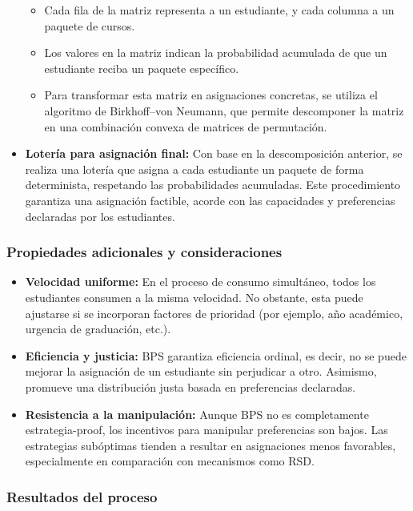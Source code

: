 \documentclass{article}
\begin{document}
\begin{itemize}
    \begin{itemize}
        \item Cada fila de la matriz representa a un estudiante, y cada columna a un paquete de cursos.
        \item Los valores en la matriz indican la probabilidad acumulada de que un estudiante reciba un paquete específico.
        \item Para transformar esta matriz en asignaciones concretas, se utiliza el algoritmo de Birkhoff–von Neumann, que permite descomponer la matriz en una combinación convexa de matrices de permutación.
    \end{itemize}

    \item \textbf{Lotería para asignación final:} Con base en la descomposición anterior, se realiza una lotería que asigna a cada estudiante un paquete de forma determinista, respetando las probabilidades acumuladas. Este procedimiento garantiza una asignación factible, acorde con las capacidades y preferencias declaradas por los estudiantes.
\end{itemize}

\subsubsection{Propiedades adicionales y consideraciones}

\begin{itemize}
    \item \textbf{Velocidad uniforme:} En el proceso de consumo simultáneo, todos los estudiantes consumen a la misma velocidad. No obstante, esta puede ajustarse si se incorporan factores de prioridad (por ejemplo, año académico, urgencia de graduación, etc.).

    \item \textbf{Eficiencia y justicia:} BPS garantiza eficiencia ordinal, es decir, no se puede mejorar la asignación de un estudiante sin perjudicar a otro. Asimismo, promueve una distribución justa basada en preferencias declaradas.

    \item \textbf{Resistencia a la manipulación:} Aunque BPS no es completamente estrategia-proof, los incentivos para manipular preferencias son bajos. Las estrategias subóptimas tienden a resultar en asignaciones menos favorables, especialmente en comparación con mecanismos como RSD.
\end{itemize}

\subsubsection{Resultados del proceso}
\end{document}

